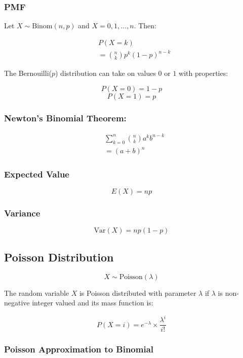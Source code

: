 \subsubsection*{PMF}

Let $X \sim \text{Binom}(n,p)$ and $X = 0,1,\dots,n$. Then:

\begin{align*}
      & P(X = k)                       \\
      & = \binom{n}{k} p^k (1-p)^{n-k}
\end{align*}

The Bernouilli($p$) distribution can take on values $0$ or $1$ with properties:

$$ P(X = 0) = 1 - p $$
$$ P(X = 1) = p $$

\subsubsection*{Newton's Binomial Theorem:}

\begin{align*}
      & \sum_{k=0}^n \binom{n}{k} a^k b^{n-k} \\
      & =(a + b)^n
\end{align*}

\subsubsection*{Expected Value}

$$ E(X) = np $$

\subsubsection*{Variance}

$$ \text{Var}(X) = np(1-p) $$

\subsection*{Poisson Distribution}

$$ X \sim \text{Poisson}(\lambda) $$

The random variable $X$ is Poisson distributed with parameter $\lambda$ if $\lambda$ is non-negative integer valued and its mass function is:

$$ P(X = i) = e^{-\lambda} \times \frac{\lambda^i}{i!} $$

\subsubsection*{Poisson Approximation to Binomial}

